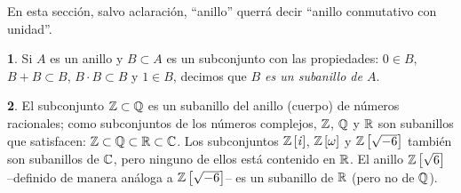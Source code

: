 \theoremstyle{plain}
\newtheorem{teoPolinomios}{\teoname}[section]
\newtheorem{coroPolinomios}[teoPolinomios]{\coroname}

\theoremstyle{definition}
\newtheorem{defPolinomios}[teoPolinomios]{}
\newtheorem{obsPolinomios}[teoPolinomios]{\obsname}
\newtheorem{ejemPolinomios}[teoPolinomios]{\ejemname}


En esta secci\'on, salvo aclaraci\'on, ``anillo'' querr\'a decir
``anillo conmutativo con unidad''.

\begin{defPolinomios}\label{def:polinomios:subanillo}
	Si $A$ es un anillo y $B\subset A$ es un subconjunto con las
	propiedades:
	$0\in B$, $B+B\subset B$, $B\cdot B\subset B$ y $1\in B$, decimos que
	\emph{$B$ es un subanillo de $A$}.
\end{defPolinomios}

\begin{ejemPolinomios}\label{ejem:polinomios:subanillo}
	El subconjunto $\mathbb{Z}\subset\mathbb{Q}$ es un subanillo del
	anillo (cuerpo) de n\'umeros racionales; como subconjuntos de los
	n\'umeros complejos, $\mathbb{Z}$, $\mathbb{Q}$ y $\mathbb{R}$ son
	subanillos que satisfacen:
	$\mathbb{Z}\subset\mathbb{Q}\subset\mathbb{R}\subset\mathbb{C}$.
	Los subconjuntos ${\mathbb{Z}}\left[\mathit i\right]$, ${\mathbb{Z}}\left[\omega\right]$ y
	${\mathbb{Z}}\left[\sqrt{-6}\right]$ tambi\'en son subanillos de
	$\mathbb{C}$, pero ninguno de ellos est\'a contenido en $\mathbb{R}$.
	El anillo ${\mathbb{Z}}\left[\sqrt 6\right]$ --definido de manera
	an\'aloga a ${\mathbb{Z}}\left[\sqrt{-6}\right]$-- es un subanillo de
	$\mathbb{R}$ (pero no de $\mathbb{Q}$).
\end{ejemPolinomios}

